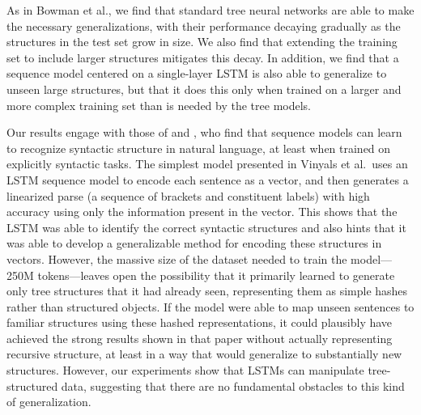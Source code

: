 As in Bowman et al., we find that standard tree neural networks are able to make the necessary generalizations, with their performance decaying gradually as the structures in the test set grow in size. We also find that extending the training set to include larger structures mitigates this decay. In addition, we find that a sequence model centered on a single-layer LSTM is also able to generalize to unseen large structures, but that it does this only when trained on a larger and more complex training set than is needed by the tree models. 

Our results engage with those of  and , who find that sequence models can learn to recognize syntactic structure in natural language, at least when trained on explicitly syntactic tasks. The simplest model presented in Vinyals et al.~uses an LSTM sequence model to encode each sentence as a vector, and then generates a linearized parse (a sequence of brackets and constituent labels) with high accuracy using only the information present in the vector. This shows that the LSTM was able to identify the correct syntactic structures and also hints that it was able to develop a generalizable method for encoding these structures in vectors. However, the massive size of the dataset needed to train the model---250M tokens---leaves open the possibility that it primarily learned to generate only tree structures that it had already seen, representing them as simple hashes rather than structured objects. If the model were able to map unseen sentences to familiar structures using these hashed representations, it could plausibly have achieved the strong results shown in that paper without actually representing recursive structure, at least in a way that would generalize to substantially new structures. However, our experiments show that LSTMs can manipulate tree-structured data, suggesting that there are no fundamental obstacles to this kind of generalization.